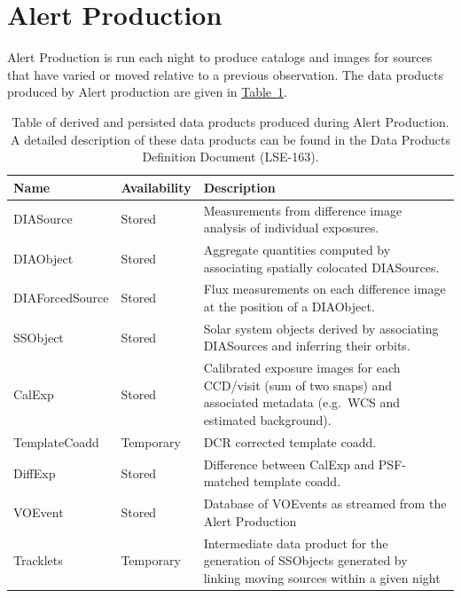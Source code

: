 \section{Alert Production}
\label{sec:ap}



Alert Production is run each night to produce catalogs and images for sources that have varied or moved relative to a previous observation.  The data products produced by Alert production are given in  \hyperref[table:ap_data_products]{Table~\ref{table:ap_data_products}}.


\begin{table}
\small
\begin{tabularx}{\textwidth}{ | l | l | X | }
  \hline
  {\bf Name} & {\bf Availability} & {\bf Description} \\
  \hline
  DIASource & Stored &
  Measurements from difference image analysis of individual exposures. \\
  \hline
  DIAObject& Stored &
  Aggregate quantities computed by associating spatially colocated DIASources. \\
  \hline
  DIAForcedSource & Stored &
  Flux measurements on each difference image at the position of a DIAObject. \\
  \hline
  SSObject & Stored &
  Solar system objects derived by associating DIASources and inferring their orbits. \\
  \hline
  CalExp & Stored &
  Calibrated exposure images for each CCD/visit (sum of two snaps) and associated metadata (e.g.\ WCS and estimated background). \\
  \hline 
TemplateCoadd & Temporary &
  DCR corrected template coadd. \\
  \hline 
  DiffExp & Stored &
  Difference between CalExp and PSF-matched template coadd. \\
  \hline 
  VOEvent & Stored &
  Database of VOEvents as streamed from the Alert Production\\
  \hline 
 Tracklets & Temporary &
  Intermediate data product for the generation of SSObjects generated by linking moving sources within a given night \\
  \hline 



  \hline
\end{tabularx}
\caption{Table of derived and persisted data products produced during  Alert Production.  A detailed  description of these data products can be found in the Data Products Definition Document (LSE-163).
\label{table:ap_data_products}}
\end{table}


